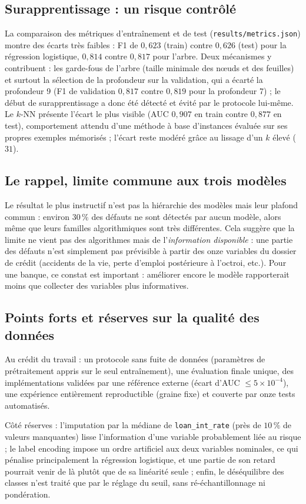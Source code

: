 \subsection{Surapprentissage : un risque contrôlé}

La comparaison des métriques d'entraînement et de test
(\texttt{results/metrics.json}) montre des écarts très faibles : F1 de
$0{,}623$ (train) contre $0{,}626$ (test) pour la régression logistique,
$0{,}814$ contre $0{,}817$ pour l'arbre. Deux mécanismes y contribuent : les
garde-fous de l'arbre (taille minimale des n\oe uds et des feuilles) et surtout
la sélection de la profondeur sur la validation, qui a écarté la profondeur 9
(F1 de validation $0{,}817$ contre $0{,}819$ pour la profondeur 7) ; le début
de surapprentissage a donc été détecté et évité par le protocole lui-même. Le
$k$-NN présente l'écart le plus visible (AUC $0{,}907$ en train contre
$0{,}877$ en test), comportement attendu d'une méthode à base d'instances
évaluée sur ses propres exemples mémorisés ; l'écart reste modéré grâce au
lissage d'un $k$ élevé ($31$).

\subsection{Le rappel, limite commune aux trois modèles}

Le résultat le plus instructif n'est pas la hiérarchie des modèles mais leur
plafond commun : environ $30\,\%$ des défauts ne sont détectés par aucun
modèle, alors même que leurs familles algorithmiques sont très différentes.
Cela suggère que la limite ne vient pas des algorithmes mais de
l'\emph{information disponible} : une partie des défauts n'est simplement pas
prévisible à partir des onze variables du dossier de crédit (accidents de la
vie, perte d'emploi postérieure à l'octroi, etc.). Pour une banque, ce constat
est important : améliorer encore le modèle rapporterait moins que collecter des
variables plus informatives.

\subsection{Points forts et réserves sur la qualité des données}

Au crédit du travail : un protocole sans fuite de données (paramètres de
prétraitement appris sur le seul entraînement), une évaluation finale unique,
des implémentations validées par une référence externe (écart d'AUC
$\leq 5 \times 10^{-4}$), une expérience entièrement reproductible (graine
fixe) et couverte par onze tests automatisés.

Côté réserves : l'imputation par la médiane de \texttt{loan\_int\_rate}
(près de $10\,\%$ de valeurs manquantes) lisse l'information d'une variable
probablement liée au risque ; le label encoding impose un ordre artificiel aux
deux variables nominales, ce qui pénalise principalement la régression
logistique, et une partie de son retard pourrait venir de là plutôt que de sa
linéarité seule ; enfin, le déséquilibre des classes n'est traité que par le
réglage du seuil, sans ré-échantillonnage ni pondération.

